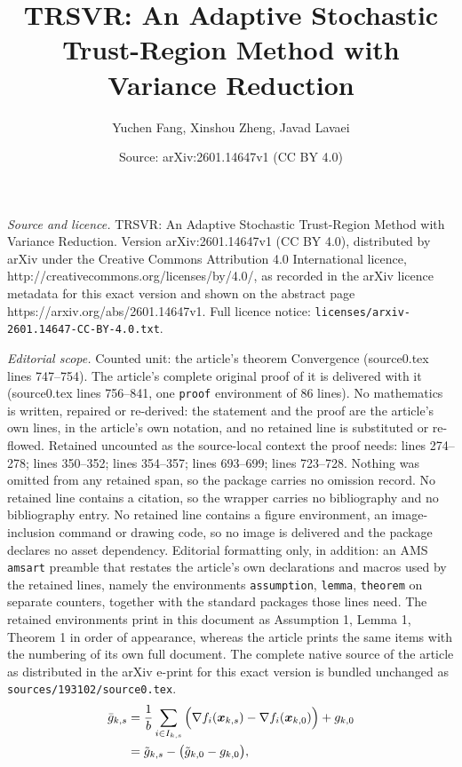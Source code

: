 \documentclass[10pt,a4paper]{amsart}
\title{TRSVR: An Adaptive Stochastic Trust-Region Method with Variance Reduction}
\author{Yuchen Fang, Xinshou Zheng, Javad Lavaei}
\date{Source: arXiv:2601.14647v1 (CC BY 4.0)}
\newcommand{\barg}{\bar{g}}
\newcommand{\bx}{\boldsymbol{x}}
\begin{document}
\maketitle

\noindent\emph{Source and licence.} TRSVR: An Adaptive Stochastic Trust-Region Method with Variance Reduction. Version arXiv:2601.14647v1 (CC BY 4.0), distributed by arXiv under the Creative Commons Attribution 4.0 International licence, http://creativecommons.org/licenses/by/4.0/, as recorded in the arXiv licence metadata for this exact version and shown on the abstract page https://arxiv.org/abs/2601.14647v1. Full licence notice: \texttt{licenses/arxiv-2601.14647-CC-BY-4.0.txt}.\par\smallskip

\noindent\textit{Editorial scope.} Counted unit: the article's theorem Convergence (source0.tex lines 747--754). The article's complete original proof of it is delivered with it (source0.tex lines 756--841, one \texttt{proof} environment of 86 lines). No mathematics is written, repaired or re-derived: the statement and the proof are the article's own lines, in the article's own notation, and no retained line is substituted or re-flowed.  Retained uncounted as the source-local context the proof needs: lines 274--278; lines 350--352; lines 354--357; lines 693--699; lines 723--728.  Nothing was omitted from any retained span, so the package carries no omission record.  No retained line contains a citation, so the wrapper carries no bibliography and no bibliography entry.  No retained line contains a figure environment, an image-inclusion command or drawing code, so no image is delivered and the package declares no asset dependency.  Editorial formatting only, in addition: an AMS \texttt{amsart} preamble that restates the article's own declarations and macros used by the retained lines, namely the environments \texttt{assumption}, \texttt{lemma}, \texttt{theorem} on separate counters, together with the standard packages those lines need.  The retained environments print in this document as Assumption 1, Lemma 1, Theorem 1 in order of appearance, whereas the article prints the same items with the numbering of its own full document.  The complete native source of the article as distributed in the arXiv e-print for this exact version is bundled unchanged as \texttt{sources/193102/source0.tex}.
\begin{align}\label{var_reduced_grad}
\barg_{k,s}
&= \frac{1}{b} \sum_{i \in I_{k,s}} \Big( \nabla f_i(\bx_{k,s}) - \nabla f_i(\bx_{k,0}) \Big) + g_{k,0} \notag \\
&= \tilde{g}_{k,s} - \big( \tilde{g}_{k,0} - g_{k,0} \big),
\end{align}
\end{document}
